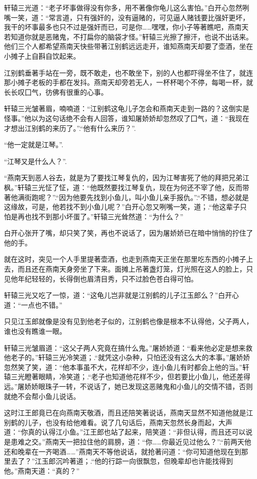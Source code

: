 \documentclass[12pt,oneside]{book}
\begin{document}
轩辕三光道：``老子坏事做得没有你多，用不著像你龟儿这么害怕。''白开心忽然咧嘴一笑，道：``常言道，只有强奸的，没有逼赌的，可见逼人赌钱要比强奸更坏，我干的坏事最多也只不过是强奸而已，可是你\ldots\ldots 嘿嘿，你小子等著瞧吧，燕南天若知道你就是恶赌鬼，不打扁你的脑袋才怪。''轩辕三光擦了擦汗，也说不出话来。他们三个人都希望燕南天快些带著江别鹤远远走开，谁知燕南天却要了壶酒，坐在小摊子上自斟自饮起来。

江别鹤垂著手站在一旁，既不敢走，也不敢坐下，别的人也都吓得坐不住了，就连那小摊子老板的手都在发抖。燕南天却旁若无人，一杯杯喝个不停，每喝一杯，就长长叹囗气，彷佛有很重的心事。

轩辕三光皱著眉，喃喃道：``江别鹤这龟儿子怎会和燕南天走到一路的？这倒实是怪事。''他以为这句话绝不会有人回答，谁知屠娇娇却忽然叹了囗气，道：``我现在才想出江别鹤的来历了。''.``他有什么来历？''.

``他一定就是江琴。''.

``江琴又是什么人？''.

``燕南天到恶人谷去，就是为了要找江琴复仇的，因为江琴害死了他的拜把兄弟江枫。''轩辕三光怔了怔，道：``他既然要找江琴复仇，现在为何还不宰了他，反而带著他满街跑呢？''.``因为他要先找到小鱼儿，叫小鱼儿亲手报仇。''.``不错，想必就是这缘故，可是，他若找不到小鱼儿呢？''白开心忽又咧嘴一笑，道；.``他这辈子只怕是再也找不到那小坏蛋了。''轩辕三光耸然道：``为什么？''

白开心张开了嘴，却只笑了笑，再也不说话了，因为屠娇娇已在暗中悄悄的拧住了他的手。

就在这时，突见一个人手里提著壶酒，也走到燕南天正坐在那里吃东西的小摊子上去，而且还在燕南天身旁坐了下来。面摊上吊著盏灯笼，灯光照在这人的脸上，只见他年纪轻轻的，长得倒也眉清目秀，只不过脸色苍白得可怕。

轩辕三光又吃了一惊，道：``这龟儿岂非就是江别鹤的儿子江玉郎么？''白开心道：``一点也不错。''

只见江玉郎就像是没有见到他老子似的，江别鹤也像是根本不认得他，父子两人，谁也没有瞧谁一眼。

轩辕三光皱眉道：``这父子两人究竟在搞什么鬼。''屠娇娇道：``看来他必定是想来救他老子的。''轩辕三光冷笑道；.``就凭这小杂种，只怕还没有这么大的本事。''屠娇娇忽然笑了笑，道：``他本事虽不大，花样却不少，连小鱼儿有时都会上他的当。''轩辕三光瞪著眼睛，冷笑道；.``老子也知道他花样不少，但若要比小鱼儿，他还差得远。''屠娇娇眼珠子一转，不说话了，她已发现这恶赌鬼和小鱼儿的交情不错，否则就绝不会帮小鱼儿说话。

这时江王郎竟已在向燕南天敬酒，而且还陪笑著说话，燕南天显然不知道他就是江别鹤的儿子，也没有给他难看。说了几句话后，燕南天忽然长身而起，大声道：``你真的认得江小鱼。''江王郎也站了起来，陪笑道：``非但认得，而且还可以说是患难之交。''燕南天一把拉住他的肩膀，道：``你\ldots\ldots 你最近见过他么？''.``前两天他还和晚辈在一齐喝酒\ldots\ldots{}''燕南天不等他说话，就抢著问道：``你可知道他现在到那里去了？''江玉郎沉吟著道；.``他的行踪一向很飘忽，但晚辈却也许能找得到他。''燕南天道：``真的？''
\end{document}
